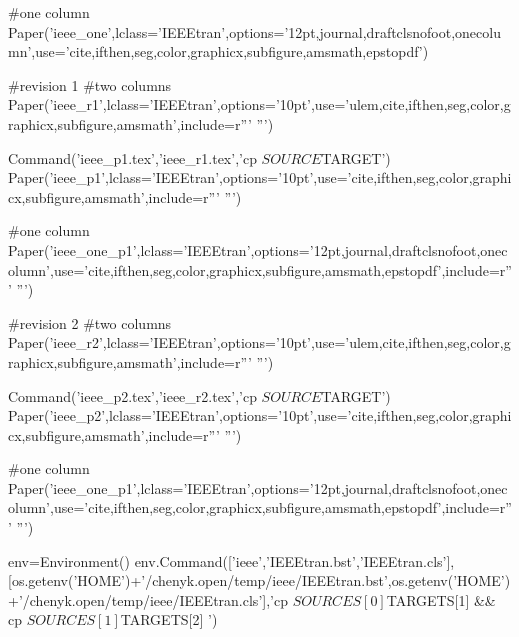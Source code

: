 \begin{itemize}[leftmargin=2em, label={\textbf{·}}]
#one column
Paper('ieee_one',lclass='IEEEtran',options='12pt,journal,draftclsnofoot,onecolumn',use='cite,ifthen,seg,color,graphicx,subfigure,amsmath,epstopdf')

#revision 1
#two columns
Paper('ieee_r1',lclass='IEEEtran',options='10pt',use='ulem,cite,ifthen,seg,color,graphicx,subfigure,amsmath',include=r'''
\DeclareRobustCommand{\old}[1]{\color{blue}{\sout{#1}}\color{black}{}}
\DeclareRobustCommand{\new}[1]{\color{red}{\textit{#1}}\color{black}{}} 
''')

Command('ieee_p1.tex','ieee_r1.tex','cp $SOURCE $TARGET')
Paper('ieee_p1',lclass='IEEEtran',options='10pt',use='cite,ifthen,seg,color,graphicx,subfigure,amsmath',include=r'''
\DeclareRobustCommand{\old}[1]{}
\DeclareRobustCommand{\new}[1]{#1}
''')

#one column
Paper('ieee_one_p1',lclass='IEEEtran',options='12pt,journal,draftclsnofoot,onecolumn',use='cite,ifthen,seg,color,graphicx,subfigure,amsmath,epstopdf',include=r'''
\DeclareRobustCommand{\old}[1]{}
\DeclareRobustCommand{\new}[1]{#1}
\DeclareRobustCommand{\dlo}[1]{}
\DeclareRobustCommand{\wen}[1]{#1}
''')


#revision 2
#two columns
Paper('ieee_r2',lclass='IEEEtran',options='10pt',use='ulem,cite,ifthen,seg,color,graphicx,subfigure,amsmath',include=r'''
\DeclareRobustCommand{\dlo}[1]{}
\DeclareRobustCommand{\wen}[1]{#1}
\DeclareRobustCommand{\old}[1]{\color{blue}{\sout{#1}}\color{black}{}}
\DeclareRobustCommand{\new}[1]{\color{red}{\textit{#1}}\color{black}{}} 
''')

Command('ieee_p2.tex','ieee_r2.tex','cp $SOURCE $TARGET')
Paper('ieee_p2',lclass='IEEEtran',options='10pt',use='cite,ifthen,seg,color,graphicx,subfigure,amsmath',include=r'''
\DeclareRobustCommand{\dlo}[1]{}
\DeclareRobustCommand{\wen}[1]{#1}
\DeclareRobustCommand{\old}[1]{}
\DeclareRobustCommand{\new}[1]{#1}
''')

#one column
Paper('ieee_one_p1',lclass='IEEEtran',options='12pt,journal,draftclsnofoot,onecolumn',use='cite,ifthen,seg,color,graphicx,subfigure,amsmath,epstopdf',include=r'''
\DeclareRobustCommand{\old}[1]{}
\DeclareRobustCommand{\new}[1]{#1}
\DeclareRobustCommand{\dlo}[1]{}
\DeclareRobustCommand{\wen}[1]{#1}
''')

env=Environment()
env.Command(['ieee','IEEEtran.bst','IEEEtran.cls'],[os.getenv('HOME')+'/chenyk.open/temp/ieee/IEEEtran.bst',os.getenv('HOME')+'/chenyk.open/temp/ieee/IEEEtran.cls'],'cp  ${SOURCES[0]}  ${TARGETS[1]} && cp  ${SOURCES[1]}  ${TARGETS[2]} ')



\end{itemize}
